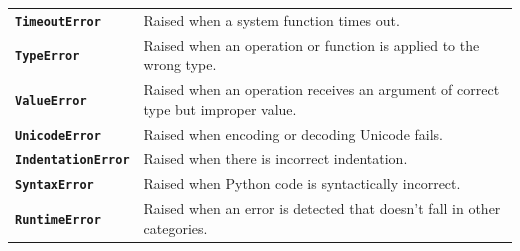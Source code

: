 \documentclass[a4paper,11pt]{article}
\begin{document}
\begin{tabular}{>{\bfseries}p{4cm} p{10cm}}
			\texttt{TimeoutError} & Raised when a system function times out. \\
			\texttt{TypeError} & Raised when an operation or function is applied to the wrong type. \\
			\texttt{ValueError} & Raised when an operation receives an argument of correct type but improper value. \\
			\texttt{UnicodeError} & Raised when encoding or decoding Unicode fails. \\
			\texttt{IndentationError} & Raised when there is incorrect indentation. \\
			\texttt{SyntaxError} & Raised when Python code is syntactically incorrect. \\
			\texttt{RuntimeError} & Raised when an error is detected that doesn’t fall in other categories. \\
			\bottomrule
		\end{tabular}
		
	
\end{document}
